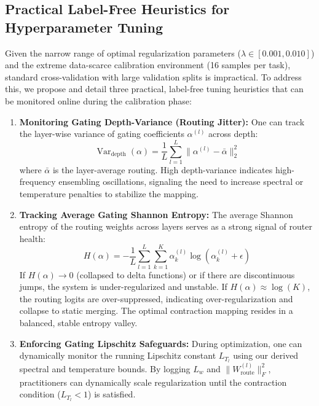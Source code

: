 \subsection{Practical Label-Free Heuristics for Hyperparameter Tuning}
Given the narrow range of optimal regularization parameters ($\lambda \in [0.001, 0.010]$) and the extreme data-scarce calibration environment (16 samples per task), standard cross-validation with large validation splits is impractical. To address this, we propose and detail three practical, label-free tuning heuristics that can be monitored online during the calibration phase:
\begin{enumerate}
  \item \textbf{Monitoring Gating Depth-Variance (Routing Jitter):} One can track the layer-wise variance of gating coefficients $\alpha^{(l)}$ across depth:
  \begin{equation}
  \operatorname{Var}_{\text{depth}}(\alpha) = \frac{1}{L} \sum_{l=1}^L \| \alpha^{(l)} - \bar{\alpha} \|_2^2
  \end{equation}
  where $\bar{\alpha}$ is the layer-average routing. High depth-variance indicates high-frequency ensembling oscillations, signaling the need to increase spectral or temperature penalties to stabilize the mapping.
  \item \textbf{Tracking Average Gating Shannon Entropy:} The average Shannon entropy of the routing weights across layers serves as a strong signal of router health:
  \begin{equation}
  H(\alpha) = -\frac{1}{L} \sum_{l=1}^L \sum_{k=1}^K \alpha_k^{(l)} \log\left(\alpha_k^{(l)} + \epsilon \right)
  \end{equation}
  If $H(\alpha) \to 0$ (collapsed to delta functions) or if there are discontinuous jumps, the system is under-regularized and unstable. If $H(\alpha) \approx \log(K)$, the routing logits are over-suppressed, indicating over-regularization and collapse to static merging. The optimal contraction mapping resides in a balanced, stable entropy valley.
  \item \textbf{Enforcing Gating Lipschitz Safeguards:} During optimization, one can dynamically monitor the running Lipschitz constant $L_{T_l}$ using our derived spectral and temperature bounds. By logging $L_w$ and $\|W_{\text{route}}^{(l)}\|_F^2$, practitioners can dynamically scale regularization until the contraction condition ($L_{T_l} < 1$) is satisfied.
\end{enumerate}

